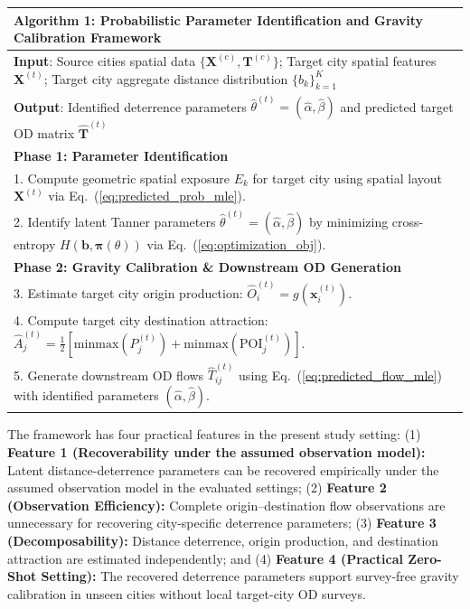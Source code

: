 \documentclass[pdflatex,sn-basic,iicol]{sn-jnl}
\begin{document}
\begin{table}[t]
\centering
\tablebodyfont\small
\begin{tabular}{p{}}
\toprule
\textbf{Algorithm 1: Probabilistic Parameter Identification and Gravity Calibration Framework} \\
\midrule
\textbf{Input}: Source cities spatial data $\{\mathbf{X}^{(c)}, \mathbf{T}^{(c)}\}$; Target city spatial features $\mathbf{X}^{(t)}$; Target city aggregate distance distribution $\{b_k\}_{k=1}^{K}$ \\
\textbf{Output}: Identified deterrence parameters $\hat{\theta}^{(t)} = (\hat{\alpha}, \hat{\beta})$ and predicted target OD matrix $\mathbf{\hat{T}}^{(t)}$ \\
\midrule
\textbf{Phase 1: Parameter Identification} \\
1. Compute geometric spatial exposure $E_k$ for target city using spatial layout $\mathbf{X}^{(t)}$ via Eq.~(\ref{eq:predicted_prob_mle}). \\
2. Identify latent Tanner parameters $\hat{\theta}^{(t)} = (\hat{\alpha}, \hat{\beta})$ by minimizing cross-entropy $H(\mathbf{b}, \boldsymbol{\pi}(\theta))$ via Eq.~(\ref{eq:optimization_obj}). \\
\midrule
\textbf{Phase 2: Gravity Calibration \& Downstream OD Generation} \\
3. Estimate target city origin production: $\hat{O}_i^{(t)} = g(\mathbf{x}_i^{(t)})$. \\
4. Compute target city destination attraction: $\hat{A}_j^{(t)} = \frac{1}{2} [\mathrm{minmax}(P_j^{(t)}) + \mathrm{minmax}(\mathrm{POI}_j^{(t)})]$. \\
5. Generate downstream OD flows $\hat{T}_{ij}^{(t)}$ using Eq.~(\ref{eq:predicted_flow_mle}) with identified parameters $(\hat{\alpha}, \hat{\beta})$. \\
\bottomrule
\end{tabular}
\end{table}

The framework has four practical features in the present study setting: (1) \textbf{Feature 1 (Recoverability under the assumed observation model):} Latent distance-deterrence parameters can be recovered empirically under the assumed observation model in the evaluated settings; (2) \textbf{Feature 2 (Observation Efficiency):} Complete origin--destination flow observations are unnecessary for recovering city-specific deterrence parameters; (3) \textbf{Feature 3 (Decomposability):} Distance deterrence, origin production, and destination attraction are estimated independently; and (4) \textbf{Feature 4 (Practical Zero-Shot Setting):} The recovered deterrence parameters support survey-free gravity calibration in unseen cities without local target-city OD surveys.
\end{document}
